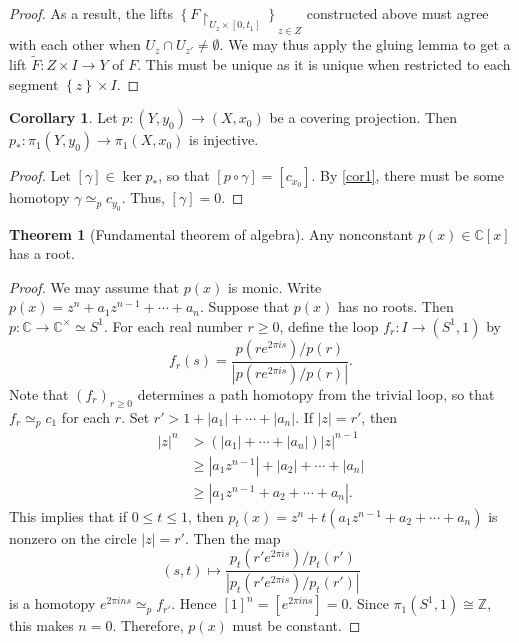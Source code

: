 \documentclass[10pt,letterpaper,cm]{nupset}
\theoremstyle{definition}
\theoremstyle{theorem}
\newtheorem{theorem}[definition]{Theorem}
\newtheorem{corollary}[definition]{Corollary}
\theoremstyle{remark}
\newcommand{\C}{\mathbb C}
\newcommand{\Z}{\mathbb Z}
\newcommand{\1}{\mathbb{1}}
\newcommand{\0}{\vec 0}
\begin{document}
\begin{proof}
 As a result, the  lifts  $\left\{F \restriction_{U_{z} \times [0, t_1]}\right\}_{z\in Z}$ constructed above must agree with each other when $U_z \cap U_{z'} \ne \emptyset$. We may thus apply the gluing lemma to get a lift $\tilde{F} : Z \times I \to Y$ of $F$. This must be unique as it is unique when restricted to each segment $\left\{z\right\} \times I$.
\end{proof}

\begin{corollary}
Let $p: \left(Y, y_0\right) \to \left(X, x_0\right)$  be a covering projection. Then $p_{\ast} : \pi_1\left(Y, y_0\right) \to \pi_1\left(X, x_0\right)$ is injective. 
\end{corollary}
\begin{proof}
Let $[\gamma] \in \ker{p_{\ast}}$, so that $[p\circ \gamma] = [c_{x_0}]$. By \cref{cor1}, there must be some homotopy $\gamma \simeq_p c_{y_0}$. Thus, $[\gamma] = 0$.
\end{proof}

\begin{theorem}[Fundamental theorem of algebra]
Any nonconstant $p(x) \in \C[x]$ has a root. 
\end{theorem}
\begin{proof}
We may assume that $p(x)$ is monic. Write $p(x) = z^n + a_{1}z^{n-1} +\cdots + a_n$. Suppose that $p(x)$ has no roots. Then $p : \C \to \C^{\times} \simeq S^1$. For each real number $r\geq 0$, define the loop $f_r : I \to (S^1, 1)$ by $$f_r(s) = \frac{p(re^{2\pi i s})/p(r)}{\left\lvert{p(re^{2\pi i s})/p(r)}\right\rvert}.$$ Note that $\left(f_r\right)_{r\geq 0}$ determines a path homotopy from the trivial loop, so that $f_r \simeq_p c_1$ for each $r$. Set $ r' > 1 + \left\lvert{a_1}\right\rvert + \cdots + \left\lvert{a_n}\right\rvert$. If $\left\lvert{z}\right\rvert =r'$, then 
\begin{align*}
 \left\lvert{z}\right\rvert^n & > (\left\lvert{a_1}\right\rvert + \cdots + \left\lvert{a_n}\right\rvert)\left\lvert{z}\right\rvert^{n-1} 
 \\ & \geq \left\lvert{a_1z^{n-1}}\right\rvert + \left\lvert{a_2}\right\rvert + \cdots + \left\lvert{a_n}\right\rvert\\ & \geq \left\lvert{a_1z^{n-1} + a_2 + \cdots + a_n}\right\rvert.
\end{align*}
This implies that if $0\leq t\leq 1$, then $p_t(x) = z^n +t(a_1z^{n-1} + a_2 + \cdots + a_n)$ is nonzero on the circle $\left\lvert{z}\right\rvert =r'$. Then the map $$(s,t) \mapsto \frac{p_t(r'e^{2\pi i s})/p_t(r')}{\left\lvert{p_t(r'e^{2\pi i s})/p_t(r')}\right\rvert}$$ is a homotopy $e^{2\pi i ns} \simeq_p f_{r'}$. Hence $[1]^n = [e^{2\pi i ns} ] = 0$. Since $\pi_1(S^1, 1) \cong \Z$, this makes $n=0$. Therefore, $p(x)$ must be constant. 
\end{proof}
\end{document}
